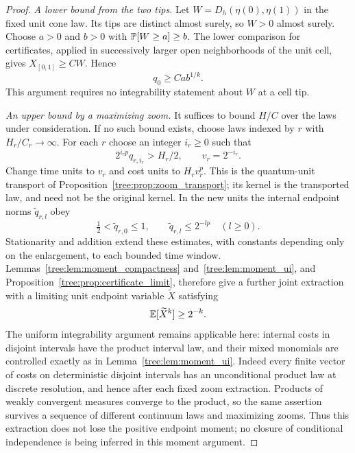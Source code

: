 \begin{proof}
\smallskip\noindent\emph{A lower bound from the two tips.}
Let $W=D_h(\eta(0),\eta(1))$ in the fixed unit cone law.  Its tips
are distinct almost surely, so $W>0$ almost surely.  Choose
$a>0$ and $b>0$ with $\mathbb P[W\geq a]\geq b$.  The lower comparison
for certificates, applied in successively larger open neighborhoods
of the unit cell, gives $X_{[0,1]}\geq CW$.  Hence
\begin{equation}
 q_0\geq C a b^{1/k}.
 \label{tree:eq:bootstrap_lower_tip_norm}
\end{equation}
This argument requires no integrability statement about $W$ at a
cell tip.

\smallskip\noindent\emph{An upper bound by a maximizing zoom.}
It suffices to bound $H/C$ over the laws under consideration.
If no such bound exists, choose laws indexed by $r$ with
$H_r/C_r\to\infty$.
For each $r$ choose an integer $i_r\geq0$ such that
\[
 2^{i_rp}q_{r,i_r}>H_r/2,
 \qquad v_r=2^{-i_r}.
\]
Change time units to $v_r$ and cost units to $H_rv_r^p$.  This
is the quantum-unit transport of Proposition~\ref{tree:prop:zoom_transport};
its kernel is the transported law, and need not be the original
kernel.  In the new units the internal endpoint norms $\widetilde
q_{r,l}$ obey
\begin{equation}
 \tfrac12<\widetilde q_{r,0}\leq1,
 \qquad \widetilde q_{r,l}\leq2^{-lp}\quad(l\geq0).
 \label{tree:eq:bootstrap_maximizing_zoom}
\end{equation}
Stationarity and addition extend these estimates, with constants
depending only on the enlargement, to each bounded time window.
Lemmas~\ref{tree:lem:moment_compactness} and~\ref{tree:lem:moment_ui}, and
Proposition~\ref{tree:prop:certificate_limit}, therefore give a further
joint extraction with a limiting unit endpoint variable
$\widetilde X$ satisfying
\[
 \mathbb E[\widetilde X^k]\geq2^{-k}.
\]
The uniform integrability argument remains applicable here: internal
costs in disjoint intervals have the product interval law, and their
mixed monomials are controlled exactly as in
Lemma~\ref{tree:lem:moment_ui}.  Indeed every finite vector of costs
on deterministic disjoint intervals has an unconditional product
law at discrete resolution, and hence after each fixed zoom
extraction.  Products of weakly convergent measures converge to
the product, so the same assertion survives a sequence of different
continuum laws and maximizing zooms.  Thus this extraction does
not lose the positive endpoint moment; no closure of conditional
independence is being inferred in this moment argument.


\end{proof}
